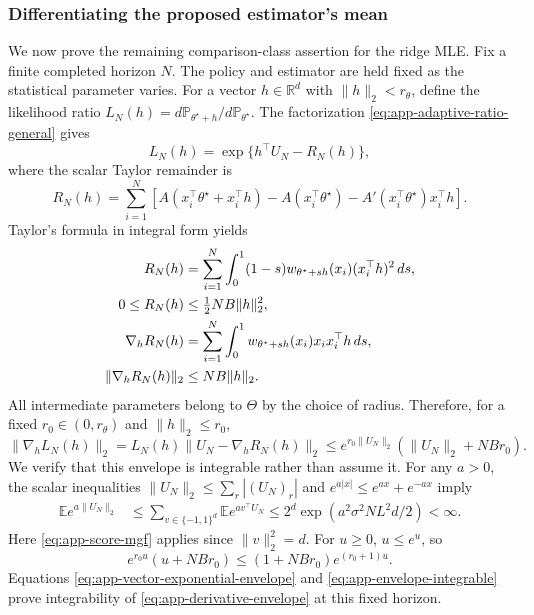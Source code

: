 \documentclass[10pt,twoside,letterpaper]{article}
\newcommand{\R}{\mathbb R}
\newcommand{\E}{\mathbb E}
\newcommand{\Prob}{\mathbb P}
\newcommand{\norm}[1]{\lVert #1\rVert}
\begin{document}
\subsubsection{Differentiating the proposed estimator's mean}
\label{app:mean-derivative}

We now prove the remaining comparison-class assertion for the ridge
MLE. Fix a finite completed horizon $N$. The policy and estimator are
held fixed as the statistical parameter varies. For a vector
$h\in\R^d$ with $\norm{h}_2<r_\theta$, define the likelihood ratio
$L_N(h)=d\Prob_{\theta^\star+h}/d\Prob_{\theta^\star}$.
The factorization \eqref{eq:app-adaptive-ratio-general} gives
\begin{equation}
L_N(h)=\exp\{h^\top U_N-R_N(h)\},
\label{eq:app-likelihood-ratio}
\end{equation}
where the scalar Taylor remainder is
\begin{equation}
R_N(h)=\sum_{i=1}^N
\left[A(x_i^\top\theta^\star+x_i^\top h)
-A(x_i^\top\theta^\star)-A'(x_i^\top\theta^\star)x_i^\top h\right].
\label{eq:app-likelihood-remainder}
\end{equation}
Taylor's formula in integral form yields
\begin{align}
R_N(h)
&=\sum_{i=1}^N\int_0^1(1-s)
 w_{\theta^\star+sh}(x_i)(x_i^\top h)^2\,ds,\notag\\
0\le R_N(h)&\le\tfrac12NB\norm{h}_2^2,\notag\\
\nabla_h R_N(h)
&=\sum_{i=1}^N\int_0^1
 w_{\theta^\star+sh}(x_i)x_ix_i^\top h\,ds,\notag\\
\norm{\nabla_hR_N(h)}_2&\le NB\norm{h}_2.
\label{eq:app-likelihood-remainder-bounds}
\end{align}
All intermediate parameters belong to $\Theta$ by the choice of
radius. Therefore, for a fixed $r_0\in(0,r_\theta)$ and
$\norm{h}_2\le r_0$,
\begin{equation}
\norm{\nabla_hL_N(h)}_2
=L_N(h)\norm{U_N-\nabla_hR_N(h)}_2
\le e^{r_0\norm{U_N}_2}(\norm{U_N}_2+NBr_0).
\label{eq:app-derivative-envelope}
\end{equation}
We verify that this envelope is integrable rather than assume it.
For any $a>0$, the scalar inequalities
$\norm{U_N}_2\le\sum_r|(U_N)_r|$ and
$e^{a|x|}\le e^{ax}+e^{-ax}$ imply
\begin{align}
\E e^{a\norm{U_N}_2}
&\le\sum_{v\in\{-1,1\}^d}\E e^{a v^\top U_N}
\le2^d\exp(a^2\sigma^2NL^2d/2)<\infty.
\label{eq:app-vector-exponential-envelope}
\end{align}
Here \eqref{eq:app-score-mgf} applies since $\norm{v}_2^2=d$.
For $u\ge0$, $u\le e^u$, so
\begin{equation}
e^{r_0u}(u+NBr_0)
\le(1+NBr_0)e^{(r_0+1)u}.
\label{eq:app-envelope-integrable}
\end{equation}
Equations \eqref{eq:app-vector-exponential-envelope} and
\eqref{eq:app-envelope-integrable} prove integrability of
\eqref{eq:app-derivative-envelope} at this fixed horizon.
\end{document}
